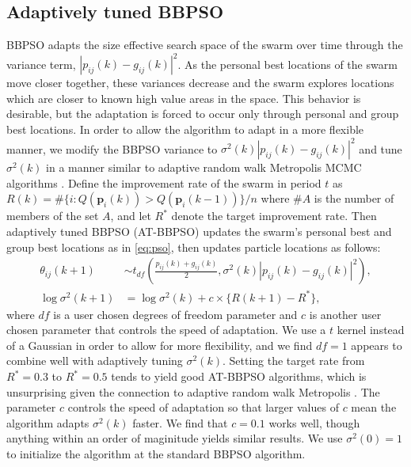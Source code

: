 \documentclass[cmbright]{staauth}
\begin{document}
\subsection{Adaptively tuned BBPSO}\label{subsec:ATBBPSO}
BBPSO adapts the size effective search space of the swarm over time through the variance term, $|p_{ij}(k) - g_{ij}(k)|^2$. As the personal best locations of the swarm move closer together, these variances decrease and the swarm explores locations which are closer to known high value areas in the space. This behavior is desirable, but the adaptation is forced to occur only through personal and group best locations. In order to allow the algorithm to adapt in a more flexible manner, we modify the BBPSO variance to $\sigma^2(k)|p_{ij}(k) - g_{ij}(k)|^2$ and tune $\sigma^2(k)$ in a manner similar to adaptive random walk Metropolis MCMC algorithms \citep{andrieu2008tutorial}. Define the improvement rate of the swarm in period $t$ as $R(k) = \#\{i:Q(\bm{p}_i(k))> Q(\bm{p}_i(k-1))\}/n$ where $\#A$ is the number of members of the set $A$, and let $R^*$ denote the target improvement rate. Then adaptively tuned BBPSO (AT-BBPSO) updates the swarm's personal best and group best locations as in \eqref{eq:pso}, then updates particle locations as follows:
\begin{align}\label{eq:at-bbpso}
\theta_{ij}(k+1) &\sim t_{df}\left(\frac{p_{ij}(k) + g_{ij}(k)}{2}, \sigma^2(k)|p_{ij}(k) - g_{ij}(k)|^2\right),\nonumber\\
\log \sigma^2(k+1) &= \log\sigma^2(k) + c\times\{R(k+1) - R^*\},
\end{align}
where $df$ is a user chosen degrees of freedom parameter and $c$ is another user chosen parameter that controls the speed of adaptation. We use a $t$ kernel instead of a Gaussian in order to allow for more flexibility, and we find $df=1$ appears to combine well with adaptively tuning $\sigma^2(k)$. Setting the target rate from $R^*=0.3$ to $R^*=0.5$ tends to yield good AT-BBPSO algorithms, which is unsurprising given the connection to adaptive random walk Metropolis \citep{gelman1996efficient}. The parameter $c$ controls the speed of adaptation so that larger values of $c$ mean the algorithm adapts $\sigma^2(k)$ faster. We find that $c=0.1$ works well, though anything within an order of maginitude yields similar results. We use $\sigma^2(0)=1$ to initialize the algorithm at the standard BBPSO algorithm.
\end{document}

